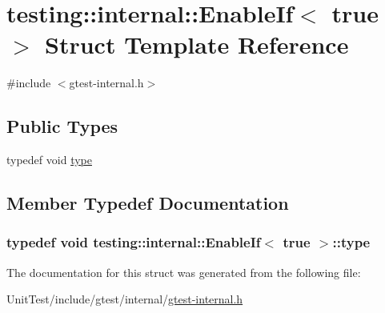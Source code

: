 \hypertarget{structtesting_1_1internal_1_1_enable_if_3_01true_01_4}{\section{testing\+:\+:internal\+:\+:Enable\+If$<$ true $>$ Struct Template Reference}
\label{structtesting_1_1internal_1_1_enable_if_3_01true_01_4}
}


{\ttfamily \#include $<$gtest-\/internal.\+h$>$}

\subsection*{Public Types}
\begin{DoxyCompactItemize}
\item 
typedef void \hyperlink{structtesting_1_1internal_1_1_enable_if_3_01true_01_4_a9398d803f1fdd99ff41823746f6299ff}{type}
\end{DoxyCompactItemize}


\subsection{Member Typedef Documentation}
\hypertarget{structtesting_1_1internal_1_1_enable_if_3_01true_01_4_a9398d803f1fdd99ff41823746f6299ff}{
\subsubsection[{type}]{\setlength{\rightskip}{0pt plus 5cm}typedef void {\bf testing\+::internal\+::\+Enable\+If}$<$ true $>$\+::{\bf type}}}\label{structtesting_1_1internal_1_1_enable_if_3_01true_01_4_a9398d803f1fdd99ff41823746f6299ff}


The documentation for this struct was generated from the following file\+:\begin{DoxyCompactItemize}
\item 
Unit\+Test/include/gtest/internal/\hyperlink{gtest-internal_8h}{gtest-\/internal.\+h}\end{DoxyCompactItemize}
